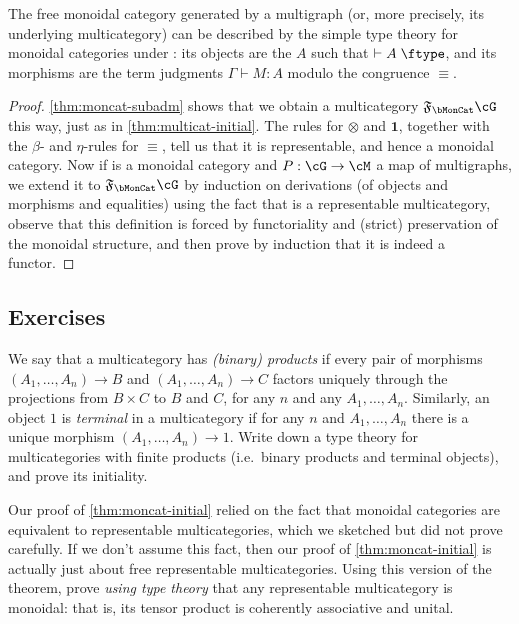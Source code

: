 \documentclass{book}
\let\types\vdash
\def\type{\;\ftype}
\newcommand{\F}[1]{\mathfrak{F}_{#1}}
\def\one{\mathbf{1}}
\let\tensor\otimes
\begin{document}
\begin{thm}\label{thm:moncat-initial}
  The free monoidal category generated by a multigraph \cG (or, more precisely, its underlying multicategory) can be described by the simple type theory for monoidal categories under \cG: its objects are the $A$ such that $\types A\type$, and its morphisms are the term judgments $\Gamma\types M:A$ modulo the congruence $\equiv$.
\end{thm}
\begin{proof}
  \cref{thm:moncat-subadm} shows that we obtain a multicategory $\F\bMonCat\cG$ this way, just as in \cref{thm:multicat-initial}.
  The rules for $\tensor$ and $\one$, together with the $\beta$- and $\eta$-rules for $\equiv$, tell us that it is representable, and hence a monoidal category.
  Now if \cM is a monoidal category and $P:\cG\to\cM$ a map of multigraphs, we extend it to $\F\bMonCat\cG$ by induction on derivations (of objects and morphisms and equalities) using the fact that \cM is a representable multicategory, observe that this definition is forced by functoriality and (strict) preservation of the monoidal structure, and then prove by induction that it is indeed a functor.
\end{proof}

\subsection*{Exercises}

\begin{ex}\label{ex:multicat-finprod}
  We say that a multicategory has \emph{(binary) products} if every pair of morphisms $(A_1,\dots,A_n) \to B$ and $(A_1,\dots,A_n) \to C$ factors uniquely through the projections from $B\times C$ to $B$ and $C$, for any $n$ and any $A_1,\dots,A_n$.
  Similarly, an object $1$ is \emph{terminal} in a multicategory if for any $n$ and $A_1,\dots,A_n$ there is a unique morphism $(A_1,\dots,A_n)\to 1$.
  Write down a type theory for multicategories with finite products (i.e.\ binary products and terminal objects), and prove its initiality.
\end{ex}

\begin{ex}\label{ex:repmulticat-moncat}
  Our proof of \cref{thm:moncat-initial} relied on the fact that monoidal categories are equivalent to representable multicategories, which we sketched but did not prove carefully.
  If we don't assume this fact, then our proof of \cref{thm:moncat-initial} is actually just about free representable multicategories.
  Using this version of the theorem, prove \emph{using type theory} that any representable multicategory is monoidal: that is, its tensor product is coherently associative and unital.
\end{ex}
\end{document}
